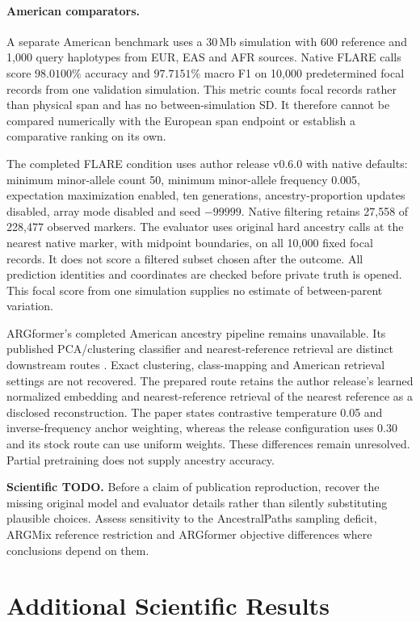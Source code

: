 \documentclass[letterpaper]{article}
\newcommand{\todo}[1]{\par\noindent\textbf{Scientific TODO.} #1\par}
\begin{document}
\paragraph{American comparators.}
A separate American benchmark uses a 30\,Mb simulation with 600 reference and 1,000 query haplotypes from EUR, EAS and AFR sources. Native FLARE calls score $98.0100\%$ accuracy and $97.7151\%$ macro F1 on 10,000 predetermined focal records from one validation simulation. This metric counts focal records rather than physical span and has no between-simulation SD. It therefore cannot be compared numerically with the European span endpoint or establish a comparative ranking on its own.

The completed FLARE condition uses author release v0.6.0 with native defaults: minimum minor-allele count 50, minimum minor-allele frequency 0.005, expectation maximization enabled, ten generations, ancestry-proportion updates disabled, array mode disabled and seed $-99999$. Native filtering retains 27,558 of 228,477 observed markers. The evaluator uses original hard ancestry calls at the nearest native marker, with midpoint boundaries, on all 10,000 fixed focal records. It does not score a filtered subset chosen after the outcome. All prediction identities and coordinates are checked before private truth is opened. This focal score from one simulation supplies no estimate of between-parent variation.

ARGformer's completed American ancestry pipeline remains unavailable. Its published PCA/clustering classifier and nearest-reference retrieval are distinct downstream routes \citep{argformer2026}. Exact clustering, class-mapping and American retrieval settings are not recovered. The prepared route retains the author release's learned normalized embedding and nearest-reference retrieval of the nearest reference as a disclosed reconstruction. The paper states contrastive temperature 0.05 and inverse-frequency anchor weighting, whereas the release configuration uses 0.30 and its stock route can use uniform weights. These differences remain unresolved. Partial pretraining does not supply ancestry accuracy.

\todo{Before a claim of publication reproduction, recover the missing original model and evaluator details rather than silently substituting plausible choices. Assess sensitivity to the AncestralPaths sampling deficit, ARGMix reference restriction and ARGformer objective differences where conclusions depend on them.}

\section{Additional Scientific Results}
\end{document}
